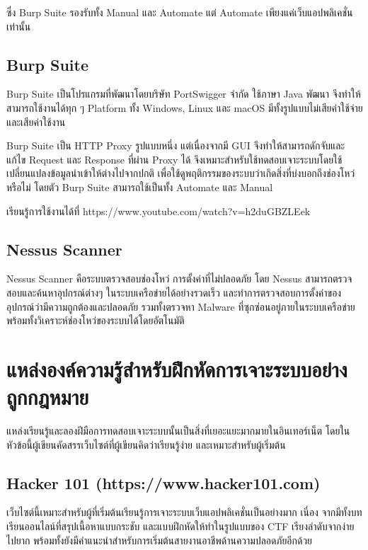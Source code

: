 ซึ่ง Burp Suite รองรับทั้ง Manual และ Automate แต่ Automate เพียงแค่เว็บแอปพลิเคชั่นเท่านั้น

\subsection{Burp Suite}

Burp Suite เป็นโปรแกรมที่พัฒนาโดยบริษัท PortSwigger จำกัด ใช้ภาษา Java พัฒนา จึงทำให้สามารถใช้งานได้ทุก ๆ Platform ทั้ง Windows, Linux และ macOS มีทั้งรูปแบบไม่เสียค่าใช้จ่ายและเสียค่าใช้งาน

Burp Suite เป็น HTTP Proxy รูปแบบหนึ่ง แต่เนื่องจากมี GUI จึงทำให้สามารถดักจับและแก้ไข Request และ Response ที่ผ่าน Proxy ได้ จึงเหมาะสำหรับใช้ทดสอบเจาะระบบโดยใช้เปลี่ยนแปลงข้อมูลนำเข้าให้ต่างไปจากปกติ เพื่อใช้ดูพฤติกรรมของระบบว่าเกิดสิ่งที่บ่งบอกถึงช่องโหว่หรือไม่ โดยตัว Burp Suite สามารถใช้เป็นทั้ง Automate และ Manual

เรียนรู้การใช้งานได้ที่ https://www.youtube.com/watch?v=h2duGBZLEek

\subsection{Nessus Scanner}
Nessus Scanner คือระบบตรวจสอบช่องโหว่ การตั้งค่าที่ไม่ปลอดภัย โดย Nessus สามารถตรวจสอบและค้นหาอุปกรณ์ต่างๆ ในระบบเครือข่ายได้อย่างรวดเร็ว และทำการตรวจสอบการตั้งค่าของอุปกรณ์ว่ามีความถูกต้องและปลอดภัย รวมทั้งตรวจหา Malware ที่ซุกซ่อนอยู่ภายในระบบเครือข่ายพร้อมทั้งวิเคราะห์ช่องโหว่ของระบบได้โดยอัตโนมัติ \cite{nessuswelcome}

\section{แหล่งองค์ความรู้สำหรับฝึกหัดการเจาะระบบอย่างถูกกฎหมาย}

แหล่งเรียนรู้และลองฝีมือการทดสอบเจาะระบบนั้นเป็นสิ่งที่เยอะแยะมากมายในอินเทอร์เน็ต โดยในหัวข้อนี้ผู้เขียนคัดสรรเว็บไซต์ที่ผู้เขียนคิดว่าเรียนรู้ง่าย และเหมาะสำหรับผู้เริ่มต้น

\subsection{Hacker 101 (https://www.hacker101.com)}

เว็บไซต์นี้เหมาะสำหรับผู้ที่เริ่มต้นเรียนรู้การเจาะระบบเว็บแอปพลิเคชั่นเป็นอย่างมาก เนี่อง จากมีทั้งบทเรียนออนไลน์ที่สรุปเนื้อหาแบบกระชับ และแบบฝึกหัดให้ทำในรูปแบบของ CTF \cite{hacker101ctf} เรียงลำดับจากง่ายไปยาก พร้อมทั้งยังมีคำแนะนำสำหรับการเริ่มต้นสายงานอาชีพด้านความปลอดภัยอีกด้วย

